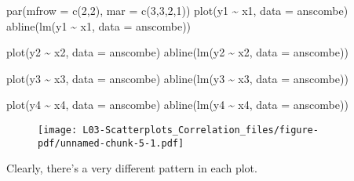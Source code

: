 \documentclass[
  letterpaper,
  DIV=11,
  numbers=noendperiod]{scrreprt}
\newenvironment{Shaded}{\begin{snugshade}}{\end{snugshade}}
\newcommand{\AttributeTok}[1]{\textcolor[rgb]{0.40,0.45,0.13}{#1}}
\newcommand{\DecValTok}[1]{\textcolor[rgb]{0.68,0.00,0.00}{#1}}
\newcommand{\FunctionTok}[1]{\textcolor[rgb]{0.28,0.35,0.67}{#1}}
\newcommand{\NormalTok}[1]{\textcolor[rgb]{0.00,0.23,0.31}{#1}}
\newcommand{\SpecialCharTok}[1]{\textcolor[rgb]{0.37,0.37,0.37}{#1}}
\begin{document}
\begin{Shaded}
\begin{Highlighting}[]
\FunctionTok{par}\NormalTok{(}\AttributeTok{mfrow =} \FunctionTok{c}\NormalTok{(}\DecValTok{2}\NormalTok{,}\DecValTok{2}\NormalTok{), }\AttributeTok{mar =} \FunctionTok{c}\NormalTok{(}\DecValTok{3}\NormalTok{,}\DecValTok{3}\NormalTok{,}\DecValTok{2}\NormalTok{,}\DecValTok{1}\NormalTok{))}
\FunctionTok{plot}\NormalTok{(y1 }\SpecialCharTok{\textasciitilde{}}\NormalTok{ x1, }\AttributeTok{data =}\NormalTok{ anscombe)}
\FunctionTok{abline}\NormalTok{(}\FunctionTok{lm}\NormalTok{(y1 }\SpecialCharTok{\textasciitilde{}}\NormalTok{ x1, }\AttributeTok{data =}\NormalTok{ anscombe))}

\FunctionTok{plot}\NormalTok{(y2 }\SpecialCharTok{\textasciitilde{}}\NormalTok{ x2, }\AttributeTok{data =}\NormalTok{ anscombe)}
\FunctionTok{abline}\NormalTok{(}\FunctionTok{lm}\NormalTok{(y2 }\SpecialCharTok{\textasciitilde{}}\NormalTok{ x2, }\AttributeTok{data =}\NormalTok{ anscombe))}

\FunctionTok{plot}\NormalTok{(y3 }\SpecialCharTok{\textasciitilde{}}\NormalTok{ x3, }\AttributeTok{data =}\NormalTok{ anscombe)}
\FunctionTok{abline}\NormalTok{(}\FunctionTok{lm}\NormalTok{(y3 }\SpecialCharTok{\textasciitilde{}}\NormalTok{ x3, }\AttributeTok{data =}\NormalTok{ anscombe))}

\FunctionTok{plot}\NormalTok{(y4 }\SpecialCharTok{\textasciitilde{}}\NormalTok{ x4, }\AttributeTok{data =}\NormalTok{ anscombe)}
\FunctionTok{abline}\NormalTok{(}\FunctionTok{lm}\NormalTok{(y4 }\SpecialCharTok{\textasciitilde{}}\NormalTok{ x4, }\AttributeTok{data =}\NormalTok{ anscombe))}
\end{Highlighting}
\end{Shaded}

\begin{figure}[H]

{\centering \texttt{[image: L03-Scatterplots\_Correlation\_files/figure-pdf/unnamed-chunk-5-1.pdf]}

}

\end{figure}

Clearly, there's a very different pattern in each plot.
\end{document}
